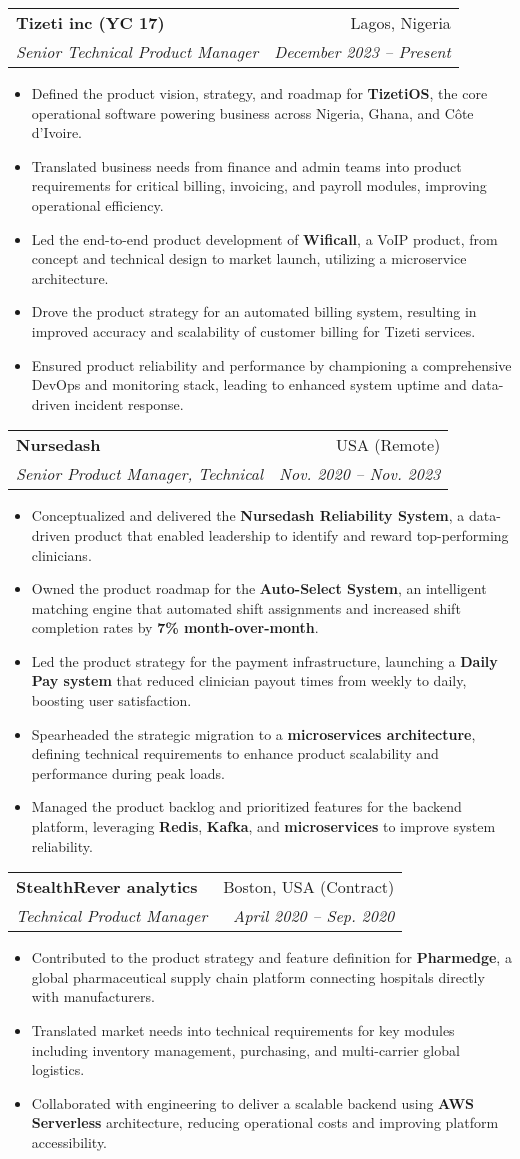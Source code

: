 \documentclass[letterpaper,11pt]{article}
\makeatletter
\newcommand{\resumeItem}[1]{
  \item\small{
    {#1 \vspace{-2pt}}
  }
}
\newcommand{\resumeSubheading}[4]{
  \vspace{-2pt}\item
    \begin{tabular*}{0.97\textwidth}[t]{l@{\extracolsep{\fill}}r}
      \textbf{#1} & #2 \\
      \textit{\small#3} & \textit{\small #4} \\
    \end{tabular*}\vspace{-7pt}
}
\newcommand{\resumeItemListStart}{\begin{itemize}}
\newcommand{\resumeItemListEnd}{\end{itemize}\vspace{-5pt}}
\makeatother
\begin{document}
    \resumeSubheading
      {Tizeti inc (YC 17)}{Lagos, Nigeria}
      {Senior Technical Product Manager}{December 2023 -- Present}
      \resumeItemListStart
        \resumeItem{Defined the product vision, strategy, and roadmap for \textbf{TizetiOS}, the core operational software powering business across Nigeria, Ghana, and Côte d'Ivoire.}
        \resumeItem{Translated business needs from finance and admin teams into product requirements for critical billing, invoicing, and payroll modules, improving operational efficiency.}
        \resumeItem{Led the end-to-end product development of \textbf{Wificall}, a VoIP product, from concept and technical design to market launch, utilizing a microservice architecture.}
        \resumeItem{Drove the product strategy for an automated billing system, resulting in improved accuracy and scalability of customer billing for Tizeti services.}
        \resumeItem{Ensured product reliability and performance by championing a comprehensive DevOps and monitoring stack, leading to enhanced system uptime and data-driven incident response.}
      \resumeItemListEnd

    \resumeSubheading
      {Nursedash}{USA (Remote)}
      {Senior Product Manager, Technical}{Nov. 2020 -- Nov. 2023}
      \resumeItemListStart
        \resumeItem{Conceptualized and delivered the \textbf{Nursedash Reliability System}, a data-driven product that enabled leadership to identify and reward top-performing clinicians.}
        \resumeItem{Owned the product roadmap for the \textbf{Auto-Select System}, an intelligent matching engine that automated shift assignments and increased shift completion rates by \textbf{7\% month-over-month}.}
        \resumeItem{Led the product strategy for the payment infrastructure, launching a \textbf{Daily Pay system} that reduced clinician payout times from weekly to daily, boosting user satisfaction.}
        \resumeItem{Spearheaded the strategic migration to a \textbf{microservices architecture}, defining technical requirements to enhance product scalability and performance during peak loads.}
        \resumeItem{Managed the product backlog and prioritized features for the backend platform, leveraging \textbf{Redis}, \textbf{Kafka}, and \textbf{microservices} to improve system reliability.}
      \resumeItemListEnd

    \resumeSubheading
      {StealthRever analytics}{Boston, USA (Contract)}
      {Technical Product Manager}{April 2020 -- Sep. 2020}
      \resumeItemListStart
        \resumeItem{Contributed to the product strategy and feature definition for \textbf{Pharmedge}, a global pharmaceutical supply chain platform connecting hospitals directly with manufacturers.}
        \resumeItem{Translated market needs into technical requirements for key modules including inventory management, purchasing, and multi-carrier global logistics.}
        \resumeItem{Collaborated with engineering to deliver a scalable backend using \textbf{AWS Serverless} architecture, reducing operational costs and improving platform accessibility.}
      \resumeItemListEnd
\end{document}
